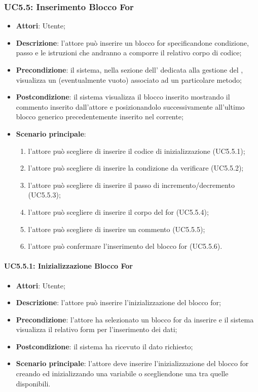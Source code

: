 \subsubsection{UC5.5: Inserimento Blocco For}
\label{UC5.5}
\begin{itemize}
	\item \textbf{Attori}: Utente;
	\item \textbf{Descrizione}: l'attore può inserire un blocco for specificandone condizione, passo e le istruzioni che andranno a comporre il relativo corpo di codice;
	\item \textbf{Precondizione}: il sistema, nella sezione dell' dedicata alla gestione del , visualizza un  (eventualmente vuoto) associato ad un particolare metodo;
	\item \textbf{Postcondizione}: il sistema visualizza il blocco inserito mostrando il commento inserito dall'attore e posizionandolo successivamente all'ultimo blocco generico precedentemente
	inserito nel  corrente;
	\item \textbf{Scenario principale}:
	\begin{enumerate}
		\item l'attore può scegliere di inserire il codice di inizializzazione (UC5.5.1);
		\item l'attore può scegliere di inserire la condizione da verificare (UC5.5.2);
		\item l'attore può scegliere di inserire il passo di incremento/decremento (UC5.5.3);
		\item l'attore può scegliere di inserire il corpo del for (UC5.5.4);
		\item l'attore può scegliere di inserire un commento (UC5.5.5);
		\item l'attore può confermare l'inserimento del blocco for (UC5.5.6).
	\end{enumerate}
\end{itemize}

\paragraph{UC5.5.1: Inizializzazione Blocco For}
\label{UC5.5.1}
\begin{itemize}
	\item \textbf{Attori}: Utente;
	\item \textbf{Descrizione}: l'attore può inserire l'inizializzazione del blocco for;
	\item \textbf{Precondizione}: l'attore ha selezionato un blocco for da inserire e il sistema visualizza il relativo form per l'inserimento dei dati;
	\item \textbf{Postcondizione}: il sistema ha ricevuto il dato richiesto;
	\item \textbf{Scenario principale}: l'attore deve inserire l'inizializzazione del blocco for creando ed inizializzando una variabile o scegliendone una tra quelle disponibili.
\end{itemize}

